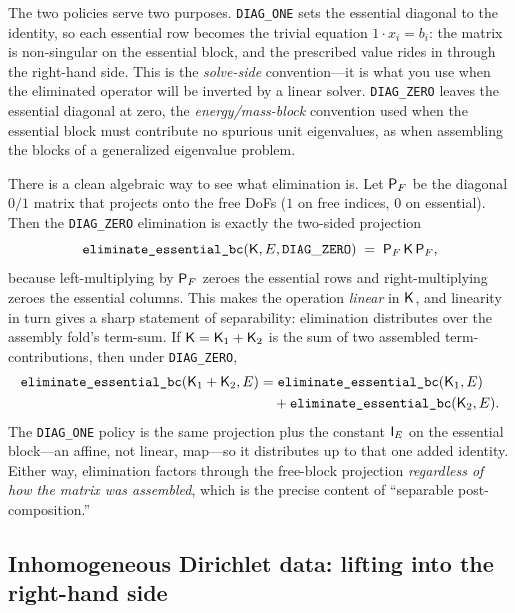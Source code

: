 The two policies serve two purposes. \texttt{DIAG\_ONE} sets the essential
diagonal to the identity, so each essential row becomes the trivial equation
$1\cdot x_i = b_i$: the matrix is non-singular on the essential block, and the
prescribed value rides in through the right-hand side. This is the
\emph{solve-side} convention---it is what you use when the eliminated operator
will be inverted by a linear solver. \texttt{DIAG\_ZERO} leaves the essential
diagonal at zero, the \emph{energy/mass-block} convention used when the essential
block must contribute no spurious unit eigenvalues, as when assembling the blocks
of a generalized eigenvalue problem.

There is a clean algebraic way to see what elimination is. Let $\mathsf{P}_F$ be the
diagonal $0/1$ matrix that projects onto the free DoFs ($1$ on free indices, $0$
on essential). Then the \texttt{DIAG\_ZERO} elimination is exactly the two-sided
projection
\begin{equation}
  \texttt{eliminate\_essential\_bc}(\mathsf{K},E,\mathtt{DIAG\_ZERO})
  \;=\; \mathsf{P}_F\,\mathsf{K}\,\mathsf{P}_F,
  \label{eq:pfproj}
\end{equation}
because left-multiplying by $\mathsf{P}_F$ zeroes the essential rows and
right-multiplying zeroes the essential columns. This makes the operation
\emph{linear} in $\mathsf{K}$, and linearity in turn gives a sharp statement of
separability: elimination distributes over the assembly fold's term-sum. If
$\mathsf{K}=\mathsf{K}_1+\mathsf{K}_2$ is the sum of two assembled term-contributions, then
under \texttt{DIAG\_ZERO},
\[
  \begin{aligned}
  \texttt{eliminate\_essential\_bc}(\mathsf{K}_1+\mathsf{K}_2,E)
  &= \texttt{eliminate\_essential\_bc}(\mathsf{K}_1,E) \\
  &\quad + \texttt{eliminate\_essential\_bc}(\mathsf{K}_2,E).
  \end{aligned}
\]
The \texttt{DIAG\_ONE} policy is the same projection plus the constant $\mathsf{I}_E$
on the essential block---an affine, not linear, map---so it distributes up to that
one added identity. Either way, elimination factors through the free-block
projection \emph{regardless of how the matrix was assembled}, which is the precise
content of ``separable post-composition.''

\subsection{Inhomogeneous Dirichlet data: lifting into the right-hand side}
\label{sec:lifting}

